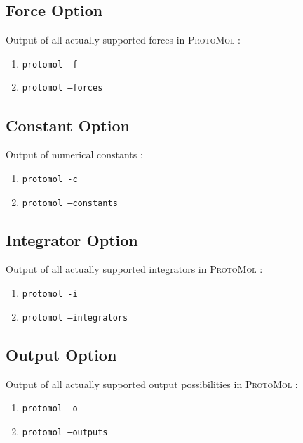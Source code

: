 \documentclass[11pt]{report}
\newcommand{\ProtoMol}{\textsc{ProtoMol }}
\providecommand{\ttsmall}[1]{\texttt{\small\mbox{#1}}}
\begin{document}
\subsection{Force Option}

Output of all actually supported forces in \ProtoMol : \\ 
\begin{enumerate}
\item \ttsmall{protomol -f} 
\item \ttsmall{protomol --forces} 
\end{enumerate}

\subsection{Constant Option}

Output of numerical constants : \\ 
\begin{enumerate}
\item \ttsmall{protomol -c} 
\item \ttsmall{protomol --constants} 
\end{enumerate}

\subsection{Integrator Option}
Output of all actually supported integrators in \ProtoMol : \\ 
\begin{enumerate}
\item \ttsmall{protomol -i} 
\item \ttsmall{protomol --integrators} 
\end{enumerate}


\subsection{Output Option}

Output of all actually supported output possibilities in \ProtoMol : \\ 
\begin{enumerate}
\item \ttsmall{protomol -o} 
\item \ttsmall{protomol --outputs} 
\end{enumerate}
\end{document}

